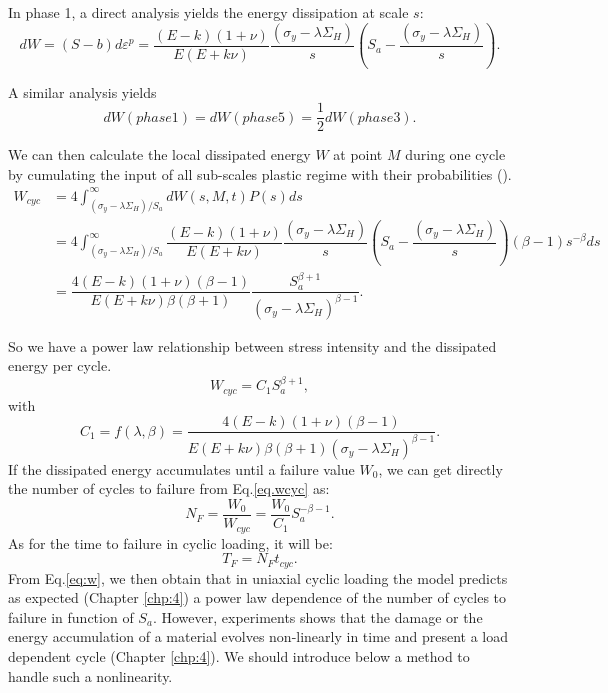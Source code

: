 In phase 1, a direct analysis yields the energy dissipation at scale $s$:
\begin{equation}dW=(S-b)d\varepsilon^p=\dfrac{(E-k)(1+\nu) }{E(E+k\nu)}\dfrac{ \left(\sigma_y-\lambda \Sigma_H\right)}{s}\left(S_{a}-\dfrac{ \left(\sigma_y-\lambda \Sigma_H\right)}{s}\right).
\label{dw}
\end{equation}

A similar analysis yields $$dW(phase 1)=dW(phase 5)=\dfrac{1}{2}dW(phase 3).$$

We can then calculate  the local dissipated energy $W$  at point $M$ during one cycle by cumulating the input of all sub-scales plastic regime with their probabilities (\cite{zepeng}).
\begin{equation}
\begin{split}
W_{cyc}&=4\int_{ \left(\sigma_y-\lambda \Sigma_H\right) /S_{a}}^{\infty}dW(s,M,t)P(s)ds
\\&=4\int_{ \left(\sigma_y-\lambda \Sigma_H\right) /S_{a}}^{\infty}\dfrac{(E-k)(1+\nu) }{E(E+k\nu)}\dfrac{ \left(\sigma_y-\lambda \Sigma_H\right)}{s}\left(S_{a}-\dfrac{ \left(\sigma_y-\lambda \Sigma_H\right)}{s}\right)\left( \beta-1\right) s^{-\beta}ds
\\&=\dfrac{4(E-k)(1+\nu)\left( \beta-1\right) }{ E(E+k\nu)\beta\left( \beta+1\right) }\dfrac{S_{a}^{\beta+1}}{ \left(\sigma_y-\lambda \Sigma_H\right)^{\beta-1}}.
\end{split}
\label{eq:w}
\end{equation}

So we have a power law relationship between stress intensity and the dissipated energy per cycle.
\begin{equation}
W_{cyc}=C_1S_{a}^{\beta+1},
\label{eq.wcyc}
\end{equation}
with 
$$C_1=f(\lambda,\beta)=\dfrac{4(E-k)(1+\nu)\left( \beta-1\right) }{ E(E+k\nu)\beta\left( \beta+1\right)\left(\sigma_y-\lambda \Sigma_H\right)^{\beta-1} }.$$
If the dissipated energy accumulates until a failure value $W_0$, we can get directly the number of cycles to failure from Eq.\eqref{eq.wcyc} as:
\begin{equation}
N_{F}=\dfrac{W_0}{W_{cyc}}=\dfrac{W_0}{C_1}S_{a}^{-\beta-1}.
\label{eq.NFcyc}
\end{equation}
As for the time to failure in cyclic loading, it will be:
$$T_{F}=N_{F}t_{cyc}.$$
From Eq.\eqref{eq:w}, we then obtain that in uniaxial cyclic loading the model predicts as expected (Chapter \ref{chp:4}) a power law dependence of the number of cycles to failure in function of $S_{a}$.
However, experiments shows that the damage or the energy accumulation of a material evolves non-linearly in time and present a load dependent cycle (Chapter \ref{chp:4}). We should introduce below a method to handle such a nonlinearity.

